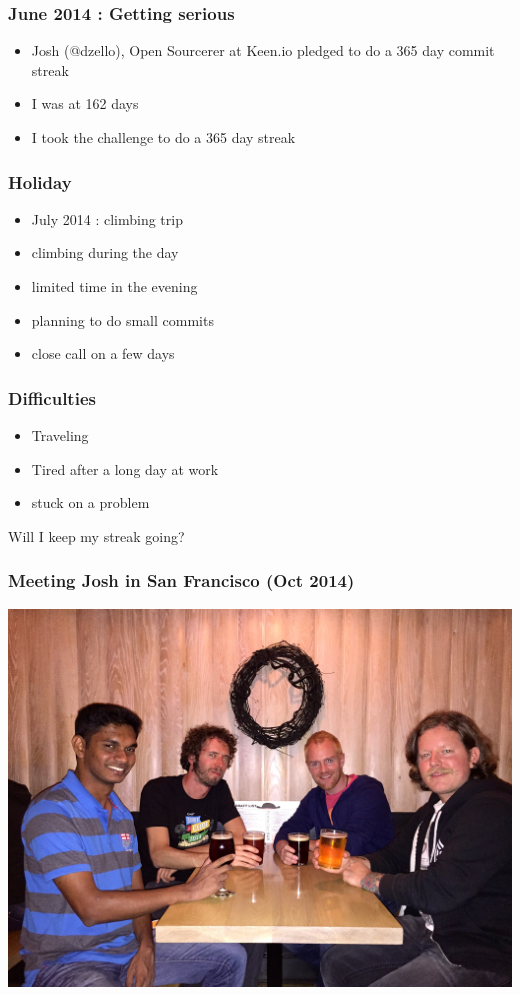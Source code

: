 \documentclass[14pt]{beamer}
\begin{document}
  \begin{frame}
    \frametitle{June 2014 : Getting serious}
    \begin{itemize}
      \item Josh (@dzello), Open Sourcerer at Keen.io pledged to do a 365 day commit streak
      \item I was at 162 days
      \item I took the challenge to do a 365 day streak
    \end{itemize}
  \end{frame}
  \begin{frame}
    \frametitle{Holiday}
    \begin{itemize}
      \item July 2014 : climbing trip
      \item climbing during the day
      \item limited time in the evening
      \item planning to do small commits
      \item close call on a few days
    \end{itemize}
  \end{frame}
  \begin{frame}
    \frametitle{Difficulties}
    \begin{itemize}
      \item Traveling
      \item Tired after a long day at work
      \item stuck on a problem
    \end{itemize}
    Will I keep my streak going?
  \end{frame}
  \begin{frame}
    \frametitle{Meeting Josh in San Francisco (Oct 2014)}
    \includegraphics[scale=.1]{josh_justin.jpg}
  \end{frame}
\end{document}
